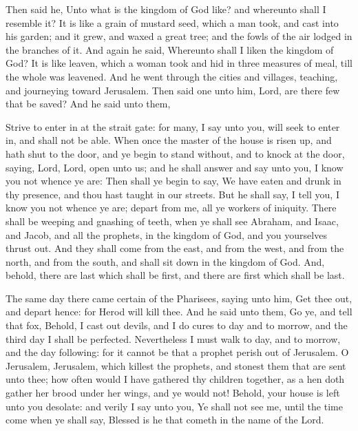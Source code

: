  Then said he, Unto what is the kingdom of God like? and
whereunto shall I resemble it?  It is like a grain of
mustard seed, which a man took, and cast into his garden; and it grew,
and waxed a great tree; and the fowls of the air lodged in the branches
of it.  And again he said, Whereunto shall I liken the
kingdom of God?  It is like leaven, which a woman took
and hid in three measures of meal, till the whole was leavened.
 And he went through the cities and villages, teaching,
and journeying toward Jerusalem.  Then said one unto him,
Lord, are there few that be saved? And he said unto them,

 Strive to enter in at the strait gate: for many, I say
unto you, will seek to enter in, and shall not be able. 
When once the master of the house is risen up, and hath shut to the
door, and ye begin to stand without, and to knock at the door, saying,
Lord, Lord, open unto us; and he shall answer and say unto you, I know
you not whence ye are:  Then shall ye begin to say, We
have eaten and drunk in thy presence, and thou hast taught in our
streets.  But he shall say, I tell you, I know you not
whence ye are; depart from me, all ye workers of iniquity.
 There shall be weeping and gnashing of teeth, when ye
shall see Abraham, and Isaac, and Jacob, and all the prophets, in the
kingdom of God, and you yourselves thrust out.  And they
shall come from the east, and from the west, and from the north, and
from the south, and shall sit down in the kingdom of God.
 And, behold, there are last which shall be first, and
there are first which shall be last.

 The same day there came certain of the Pharisees, saying
unto him, Get thee out, and depart hence: for Herod will kill thee.
 And he said unto them, Go ye, and tell that fox, Behold,
I cast out devils, and I do cures to day and to morrow, and the third
day I shall be perfected.  Nevertheless I must walk to
day, and to morrow, and the day following: for it cannot be that a
prophet perish out of Jerusalem.  O Jerusalem, Jerusalem,
which killest the prophets, and stonest them that are sent unto thee;
how often would I have gathered thy children together, as a hen doth
gather her brood under her wings, and ye would not! 
Behold, your house is left unto you desolate: and verily I say unto you,
Ye shall not see me, until the time come when ye shall say, Blessed is
he that cometh in the name of the Lord.

